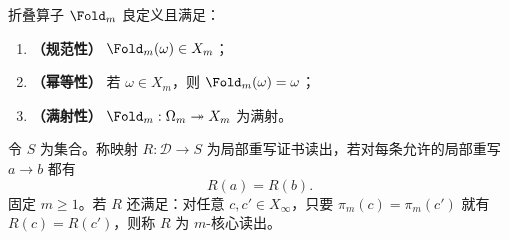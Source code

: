 \begin{proposition}\label{prop:fold-basic}
折叠算子 $\Fold_m$ 良定义且满足：
\begin{enumerate}
\normalfont
  \item \textbf{（规范性）} $\Fold_m(\omega)\in X_m$；
  \item \textbf{（幂等性）} 若 $\omega\in X_m$，则 $\Fold_m(\omega)=\omega$；
  \item \textbf{（满射性）} $\Fold_m:\Omega_m\twoheadrightarrow X_m$ 为满射。
\end{enumerate}
\end{proposition}
\begin{definition}[局部重写证书读出]\label{def:distill-stallings-local-rewrite-certified-readout}
令 \(S\) 为集合。称映射 \(R:\mathcal D\to S\) 为局部重写证书读出，若对每条允许的局部重写 \(a\to b\) 都有
\[
R(a)=R(b).
\]
固定 \(m\ge1\)。若 \(R\) 还满足：对任意 \(c,c'\in X_\infty\)，只要 \(\pi_m(c)=\pi_m(c')\) 就有 \(R(c)=R(c')\)，则称 \(R\) 为 \(m\)-核心读出。
\end{definition}

